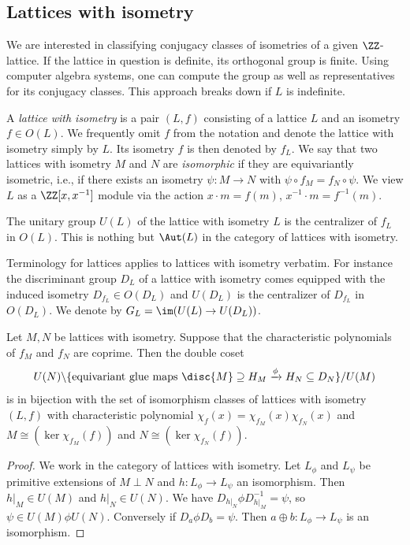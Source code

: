 \subsection{Lattices with isometry}
We are interested in classifying conjugacy classes of isometries of a given $\ZZ$-lattice.
If the lattice in question is definite, its orthogonal group is finite. Using computer algebra systems, one can compute the group as well as representatives for its conjugacy classes. This approach breaks down if $L$ is indefinite.

\begin{definition}
A \emph{lattice with isometry} is a pair $(L,f)$ consisting of a lattice $L$ and an isometry $f \in O(L)$.
We frequently omit $f$ from the notation and denote the lattice with isometry simply by $L$. Its isometry $f$ is then denoted by $f_L$.
We say that two lattices with isometry $M$ and $N$ are \emph{isomorphic}
if they are equivariantly isometric, i.e., if there exists an isometry
$\psi \colon M \to N$ with $\psi \circ f_{M} = f_{N} \circ \psi$.
We view $L$ as a $\ZZ[x,x^{-1}]$ module via the action $x \cdot m = f(m)$, $x^{-1} \cdot m = f^{-1}(m)$.
\end{definition}
The unitary group $U(L)$ of the lattice with isometry $L$ is the centralizer of $f_L$ in $O(L)$. This is nothing but $\Aut(L)$ in the category of lattices with isometry.

Terminology for lattices applies to lattices with isometry verbatim. For instance the discriminant group $D_L$ of a lattice with isometry comes equipped with the induced isometry $D_{f_L} \in O(D_L)$ and
$U(D_L)$ is the centralizer of $D_{f_L}$ in $O(D_L)$. We denote by
$G_L = \im( U(L) \to U(D_L))$.

\begin{proposition}\label{extensions}
Let $M,N$ be lattices with isometry.
Suppose that the characteristic polynomials of $f_M$ and $f_N$ are coprime.
Then the double coset
\[U(N) \backslash \{\mbox{equivariant glue maps } \disc{M} \supseteq H_M \xrightarrow{\phi } H_N \subseteq D_{N} \} / U(M)\]
is in bijection with the set of isomorphism classes of lattices with isometry $(L,f)$ with characteristic polynomial $\chi_f(x) = \chi_{f_{M}}(x)\chi_{f_{N}}(x)$ and $M \cong (\ker \chi_{f_M}(f))$ and $N \cong (\ker \chi_{f_N}(f))$.
\end{proposition}
\begin{proof}
We work in the category of lattices with isometry. Let $L_\phi$ and $L_{\psi}$ be primitive extensions of $M \perp N$ and $h\colon L_\phi \to L_\psi$ an isomorphism.
Then $h|_M \in U(M)$ and $h|_N \in U(N)$.
We have $D_{h|_N}\phi D_{h|_M}^{-1} = \psi$, so $\psi \in U(M) \phi U(N)$.
Conversely if $D_a \phi D_b = \psi$. Then $a \oplus b \colon L_\phi \to L_\psi$ is an isomorphism.
\end{proof}


